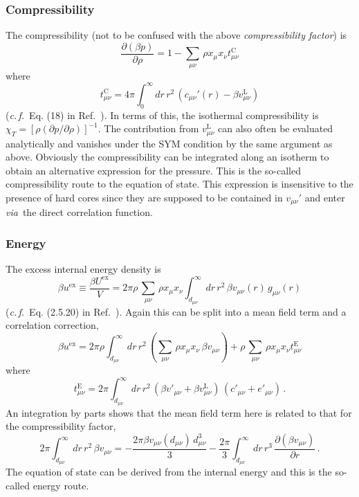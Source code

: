 \documentclass[12pt,a4paper]{article}
\newcommand{\latin}[1]{\emph{#1}}
\newcommand{\cf}{\latin{c.\,f.}}
\newcommand{\via}{\latin{via}}
\newcommand{\myex}{^{\mathrm{ex}}}
\newcommand{\Uex}{U\myex}
\newcommand{\uex}{u\myex}
\newcommand{\lr}{^{\mathrm{L}}}
\newcommand{\Refcite}[1]{Ref.~\cite{#1}}
\begin{document}
\subsubsection{Compressibility}
%
The compressibility (not to be confused with the above
\emph{compressibility factor}) is
%
\begin{equation}
\frac{\partial(\beta p)}{\partial\rho}=
1-{\textstyle \sum_{\mu\nu}}\,\rho x_\mu x_\nu t^{\mathrm{C}}_{\mu\nu}
\end{equation}
%
where
%
\begin{equation}
t^{\mathrm{C}}_{\mu\nu}={4\pi}\int_0^\infty\!\!dr\,r^2\,(c_{\mu\nu}'(r)
-\beta v_{\mu\nu}\lr)
\end{equation}
%
(\cf\ Eq. (18) in \Refcite{Vrbka09}).  In terms of this, the
isothermal compressibility is $\chi_T=[\rho(\partial
  p/\partial\rho)]^{-1}$.  The contribution from $v_{\mu\nu}\lr$ can
also often be evaluated analytically and vanishes under the SYM
condition by the same argument as above.  Obviously the
compressibility can be integrated along an isotherm to obtain an
alternative expression for the pressure.  This is the so-called
compressibility route to the equation of state.  This expression is
insensitive to the presence of hard cores since they are supposed to
be contained in $v_{\mu\nu}'$ and enter \via\ the direct correlation
function.

\subsubsection{Energy}
%
The excess internal energy density is
%
\begin{equation}
  \beta\uex\equiv
  \frac{\beta \Uex}{V}=2\pi\rho\,{\textstyle \sum_{\mu\nu}}\,\rho x_\mu x_\nu 
\int_{d_{\mu\nu}}^\infty\!\!dr\, r^2\, \beta v_{\mu\nu}(r)\,g_{\mu\nu}(r)
\end{equation}
%
(\cf\ Eq. (2.5.20) in \Refcite{HM06}).  Again this can be split into
a mean field term and a correlation correction,
%
\begin{equation}
{\beta\uex}={2\pi\rho}\int_{d_{\mu\nu}}^\infty\!\!dr\,r^2\,
({\textstyle \sum_{\mu\nu}}\,\rho x_\mu x_\nu\,\beta
  v_{\mu\nu})
+\rho\,{\textstyle \sum_{\mu\nu}}\,
\rho x_\mu x_\nu t^{\mathrm{E}}_{\mu\nu}
\end{equation}
%
where 
%
\begin{equation}
t^{\mathrm{E}}_{\mu\nu}={2\pi}\int_{d_{\mu\nu}}^\infty\!\!dr\,r^2\,
(\beta v'_{\mu\nu}+\beta v_{\mu\nu}\lr)\,(c'_{\mu\nu}+e'_{\mu\nu})\,.
\end{equation}
%
An integration by parts shows that the mean field term here is related
to that for the compressibility factor,
%
\begin{equation}
{2\pi}\int_{d_{\mu\nu}}^\infty\!\!dr\,r^2\,
\beta v_{\mu\nu}
=
-\frac{2\pi\beta v_{\mu\nu}(d_{\mu\nu})\,d_{\mu\nu}^3}{3}
-\frac{2\pi}{3}\int_{d_{\mu\nu}}^\infty\!\!dr\,r^3\,
\frac{\partial(\beta
  v_{\mu\nu})}{\partial r}\,.\label{eq:same}
\end{equation}
%
The equation of state can be derived from the internal energy and this
is the so-called energy route.
\end{document}
